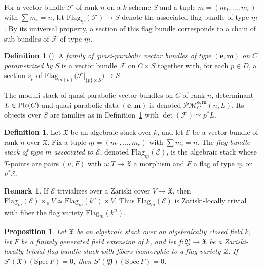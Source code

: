 \documentclass[12pt,reqno]{amsart}
\DeclareMathOperator{\Pic}{\textnormal{Pic}}
\newcommand{\mf}[1]{\mathfrak{#1}}
\newcommand{\mc}[1]{\mathcal{#1}}
\newtheorem{proposition}[theorem]{Proposition}
\theoremstyle{definition}
\newtheorem{definition}[theorem]{Definition}
\newtheorem{remark}[theorem]{Remark}
\numberwithin{equation}{section}
\begin{document}
	For a vector bundle $\mc{F}$ of rank $n$ on a $k$-scheme $S$ and a tuple
	$\underline{m}=(m_1,\ldots,m_e)$ with $\sum m_i=n$, let
	$\mathrm{Flag}_{\underline{m}}(\mc{F})\longrightarrow S$ denote the
	associated flag bundle of type $\underline{m}$. By its universal property, a
	section of this flag bundle corresponds to a chain of sub-bundles of $\mc{F}$
	of type $\underline{m}$.
	
	\begin{definition}[]
		\label{def:families-of-quasi-parabolic-bundles}
		A \textit{family of quasi-parabolic vector bundles of type $(\boldsymbol{e,m})$
			on $C$ parametrized by $S$} is a vector bundle $\mc{F}$ on $C\times S$
		together with, for each $p\in D$, a section $s_p$ of
		$\mathrm{Flag}_{\underline{m}(p)}\bigl(\mc{F}|_{\{p\}\times S}\bigr)
		\longrightarrow S$.
	\end{definition}
	
	The moduli stack of quasi-parabolic vector bundles on $C$ of rank $n$,
	determinant $L\in\Pic(C)$ and quasi-parabolic data $(\boldsymbol{e,m})$ is
	denoted $\mc{PM}_C^{\boldsymbol{e,m}}(n,L)$. Its objects over $S$ are
	families as in Definition~\ref{def:families-of-quasi-parabolic-bundles} with
	$\det(\mc{F})\simeq p^*L$.
	
	\begin{definition}\label{def:flag-bundle-stack}
		Let $\mf{X}$ be an algebraic stack over $k$, and let $\mc{E}$ be a vector
		bundle of rank $n$ over $\mf{X}$. Fix a tuple
		$\underline{m}=(m_1,\ldots,m_e)$ with $\sum m_i=n$. The \textit{flag bundle
			stack of type $\underline{m}$ associated to $\mc{E}$}, denoted
		$\mathrm{Flag}_{\underline{m}}(\mc{E})$, is the algebraic stack whose
		$T$-points are pairs $(u, F)$ with $u: T\to \mf{X}$ a morphism and $F$ a
		flag of type $\underline{m}$ on $u^*\mc{E}$.
	\end{definition}
	
	\begin{remark}
		If $\mc{E}$ trivializes over a Zariski cover $V\to\mf{X}$, then
		$\mathrm{Flag}_{\underline{m}}(\mc{E})\times_{\mf{X}} V \simeq
		\mathrm{Flag}_{\underline{m}}(k^n)\times V$. Thus
		$\mathrm{Flag}_{\underline{m}}(\mc{E})$ is Zariski-locally trivial with
		fiber the flag variety $\mathrm{Flag}_{\underline{m}}(k^n)$.
	\end{remark}
	
	\begin{proposition}\label{prop:flag-bundle-a1-connected}
		Let $\mf{X}$ be an algebraic stack over an algebraically closed field $k$,
		let $F$ be a finitely generated field extension of $k$, and let
		$f: \mf{Y}\longrightarrow \mf{X}$ be a Zariski-locally trivial flag bundle
		stack with fibers isomorphic to a flag variety $Z$. If
		$S'(\mf{X})(\mathrm{Spec}\,F)=0$, then $S'(\mf{Y})(\mathrm{Spec}\,F)=0$.
	\end{proposition}
	
\end{document}
